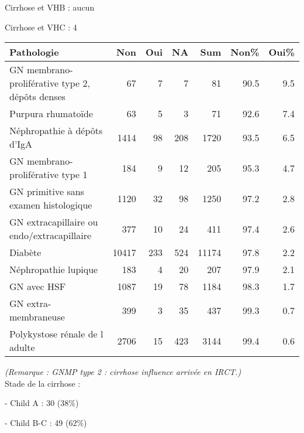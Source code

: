 \documentclass[11pt,a4paper]{article}\usepackage[]{graphicx}\usepackage[]{color}
\begin{document}
Cirrhose et VHB : aucun

Cirrhose et VHC : 4

\begin{table}[H]
\centering
\begin{tabular}{lrrrrrr}
  \hline
Pathologie & Non & Oui & NA & Sum & Non\% & Oui\% \\ 
  \hline
GN membrano-proliférative type 2, dépôts denses & 67 &  7 &  7 & 81 & 90.5 & 9.5 \\ 
  Purpura rhumatoïde & 63 &  5 &  3 & 71 & 92.6 & 7.4 \\ 
  Néphropathie à dépôts d'IgA & 1414 & 98 & 208 & 1720 & 93.5 & 6.5 \\ 
  GN membrano-proliférative type 1 & 184 &  9 & 12 & 205 & 95.3 & 4.7 \\ 
  GN primitive sans examen histologique & 1120 & 32 & 98 & 1250 & 97.2 & 2.8 \\ 
  GN extracapillaire ou endo/extracapillaire & 377 & 10 & 24 & 411 & 97.4 & 2.6 \\ 
  Diabète & 10417 & 233 & 524 & 11174 & 97.8 & 2.2 \\ 
  Néphropathie lupique & 183 &  4 & 20 & 207 & 97.9 & 2.1 \\ 
  GN avec HSF & 1087 & 19 & 78 & 1184 & 98.3 & 1.7 \\ 
  GN extra-membraneuse & 399 &  3 & 35 & 437 & 99.3 & 0.7 \\ 
  Polykystose rénale de l adulte & 2706 & 15 & 423 & 3144 & 99.4 & 0.6 \\ 
   \hline
\end{tabular}
\end{table}


\textit{(Remarque : GNMP type 2 : cirrhose influence arrivée en IRCT.)}
~\\

Stade de la cirrhose :

- Child A : 30 (38\%)

- Child B-C : 49 (62\%)
\end{document}

